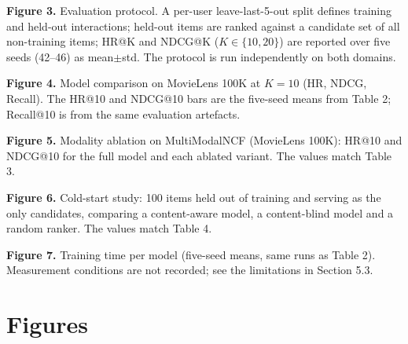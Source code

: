 \documentclass[11pt,a4paper]{article}
\begin{document}
\noindent \textbf{Figure 3.} Evaluation protocol. A per-user leave-last-5-out
split defines training and held-out interactions; held-out items are ranked
against a candidate set of all non-training items; HR@K and NDCG@K
($K\in\{10,20\}$) are reported over five seeds (42--46) as mean$\pm$std. The
protocol is run independently on both domains.

\noindent \textbf{Figure 4.} Model comparison on MovieLens 100K at $K{=}10$
(HR, NDCG, Recall). The HR@10 and NDCG@10 bars are the five-seed means from
Table 2; Recall@10 is from the same evaluation artefacts.

\noindent \textbf{Figure 5.} Modality ablation on MultiModalNCF (MovieLens 100K):
HR@10 and NDCG@10 for the full model and each ablated variant. The values match
Table 3.

\noindent \textbf{Figure 6.} Cold-start study: 100 items held out of training and
serving as the only candidates, comparing a content-aware model, a content-blind
model and a random ranker. The values match Table 4.

\noindent \textbf{Figure 7.} Training time per model (five-seed means, same runs
as Table 2). Measurement conditions are not recorded; see the limitations in
Section 5.3.

\endgroup

\clearpage
\section*{Figures}

\clearpage
\begin{center}
\end{center}
\end{document}
